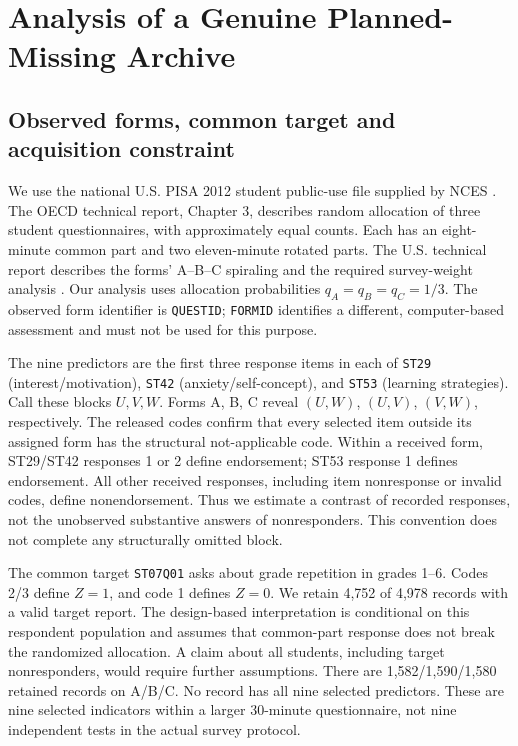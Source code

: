 \section{Analysis of a Genuine Planned-Missing Archive}\label{app:pisa}

\subsection{Observed forms, common target and acquisition constraint}
We use the national U.S. PISA 2012 student public-use file supplied by NCES
\citep{pisaus2014}. The OECD technical report, Chapter 3, describes random
allocation of three student questionnaires, with approximately equal
counts. Each has an eight-minute common part and two eleven-minute rotated
parts. The U.S. technical report describes the forms' A--B--C spiraling
and the required survey-weight analysis \citep{pisa2014,kastberg2014}.
Our analysis uses allocation probabilities $q_A=q_B=q_C=1/3$. The observed
form identifier is \texttt{QUESTID}; \texttt{FORMID} identifies a different,
computer-based assessment and must not be used for this purpose.

The nine predictors are the first three response items in each of
\texttt{ST29} (interest/motivation), \texttt{ST42} (anxiety/self-concept),
and \texttt{ST53} (learning strategies). Call these blocks $U,V,W$.
Forms A, B, C reveal $(U,W)$, $(U,V)$, $(V,W)$, respectively. The released
codes confirm that every selected item outside its assigned form has the
structural not-applicable code. Within a received form, ST29/ST42 responses
1 or 2 define endorsement; ST53 response 1 defines endorsement. All other
received responses, including item nonresponse or invalid codes, define
nonendorsement. Thus we estimate a contrast of recorded responses, not
the unobserved substantive answers of nonresponders. This convention does
not complete any structurally omitted block.

The common target \texttt{ST07Q01} asks about grade repetition in grades
1--6. Codes 2/3 define $Z=1$, and code 1 defines $Z=0$. We retain 4,752 of
4,978 records with a valid target report. The design-based interpretation
is conditional on this respondent population and assumes that common-part
response does not break the randomized allocation. A claim about all
students, including target nonresponders, would require further assumptions.
There are 1,582/1,590/1,580 retained records on A/B/C. No record has all
nine selected predictors. These are nine selected indicators within a
larger 30-minute questionnaire, not nine independent tests in the actual
survey protocol.

